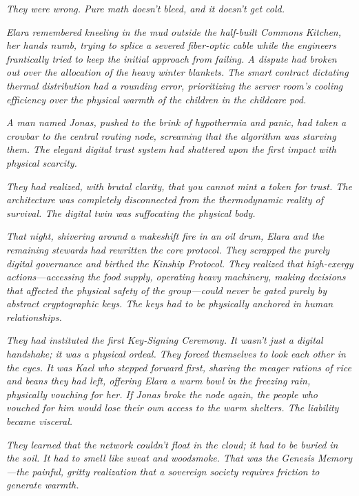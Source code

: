 \textit{They were wrong. Pure math doesn't bleed, and it doesn't get cold.}

\textit{Elara remembered kneeling in the mud outside the half-built Commons Kitchen, her hands numb, trying to splice a severed fiber-optic cable while the engineers frantically tried to keep the initial approach from failing. A dispute had broken out over the allocation of the heavy winter blankets. The smart contract dictating thermal distribution had a rounding error, prioritizing the server room's cooling efficiency over the physical warmth of the children in the childcare pod.}

\textit{A man named Jonas, pushed to the brink of hypothermia and panic, had taken a crowbar to the central routing node, screaming that the algorithm was starving them. The elegant digital trust system had shattered upon the first impact with physical scarcity.}

\textit{They had realized, with brutal clarity, that you cannot mint a token for trust. The architecture was completely disconnected from the thermodynamic reality of survival. The digital twin was suffocating the physical body.}

\textit{That night, shivering around a makeshift fire in an oil drum, Elara and the remaining stewards had rewritten the core protocol. They scrapped the purely digital governance and birthed the Kinship Protocol. They realized that high-exergy actions—accessing the food supply, operating heavy machinery, making decisions that affected the physical safety of the group—could never be gated purely by abstract cryptographic keys. The keys had to be physically anchored in human relationships.}

\textit{They had instituted the first Key-Signing Ceremony. It wasn't just a digital handshake; it was a physical ordeal. They forced themselves to look each other in the eyes. It was Kael who stepped forward first, sharing the meager rations of rice and beans they had left, offering Elara a warm bowl in the freezing rain, physically vouching for her. If Jonas broke the node again, the people who vouched for him would lose their own access to the warm shelters. The liability became visceral.}

\textit{They learned that the network couldn't float in the cloud; it had to be buried in the soil. It had to smell like sweat and woodsmoke. That was the Genesis Memory—the painful, gritty realization that a sovereign society requires friction to generate warmth.}


